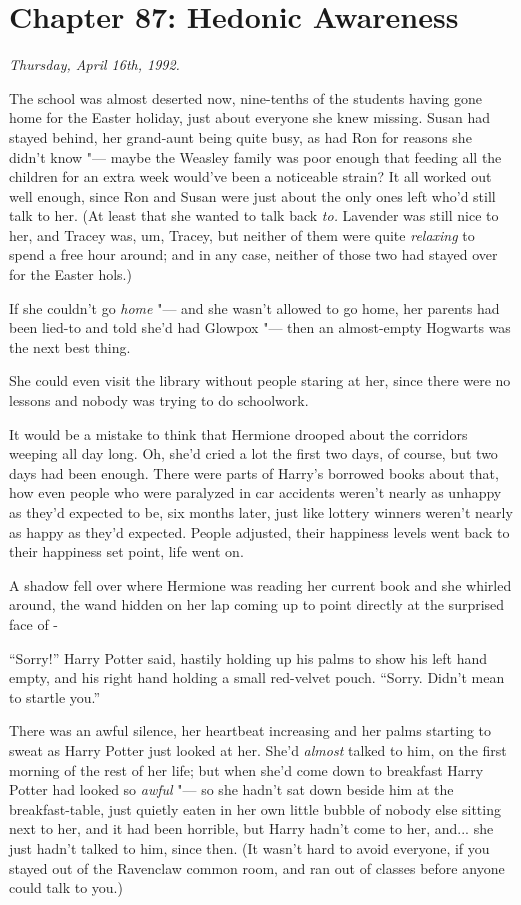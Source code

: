 \chapter{Chapter 87: Hedonic Awareness}
\emph{Thursday, April 16th, 1992.}

The school was almost deserted now, nine-tenths of the students having
gone home for the Easter holiday, just about everyone she knew missing.
Susan had stayed behind, her grand-aunt being quite busy, as had Ron for
reasons she didn't know "--- maybe the Weasley family was poor enough that
feeding all the children for an extra week would've been a noticeable
strain? It all worked out well enough, since Ron and Susan were just
about the only ones left who'd still talk to her. (At least that she
wanted to talk back \emph{to.} Lavender was still nice to her, and
Tracey was, um, Tracey, but neither of them were quite \emph{relaxing}
to spend a free hour around; and in any case, neither of those two had
stayed over for the Easter hols.)

If she couldn't go \emph{home} "--- and she wasn't allowed to go home, her
parents had been lied-to and told she'd had Glowpox "--- then an
almost-empty Hogwarts was the next best thing.

She could even visit the library without people staring at her, since
there were no lessons and nobody was trying to do schoolwork.

It would be a mistake to think that Hermione drooped about the corridors
weeping all day long. Oh, she'd cried a lot the first two days, of
course, but two days had been enough. There were parts of Harry's
borrowed books about that, how even people who were paralyzed in car
accidents weren't nearly as unhappy as they'd expected to be, six months
later, just like lottery winners weren't nearly as happy as they'd
expected. People adjusted, their happiness levels went back to their
happiness set point, life went on.

A shadow fell over where Hermione was reading her current book and she
whirled around, the wand hidden on her lap coming up to point directly
at the surprised face of -

``Sorry!'' Harry Potter said, hastily holding up his palms to show his
left hand empty, and his right hand holding a small red-velvet pouch.
``Sorry. Didn't mean to startle you.''

There was an awful silence, her heartbeat increasing and her palms
starting to sweat as Harry Potter just looked at her. She'd
\emph{almost} talked to him, on the first morning of the rest of her
life; but when she'd come down to breakfast Harry Potter had looked so
\emph{awful} "--- so she hadn't sat down beside him at the breakfast-table,
just quietly eaten in her own little bubble of nobody else sitting next
to her, and it had been horrible, but Harry hadn't come to her,
and... she just hadn't talked to him, since then. (It wasn't hard
to avoid everyone, if you stayed out of the Ravenclaw common room, and
ran out of classes before anyone could talk to you.)

